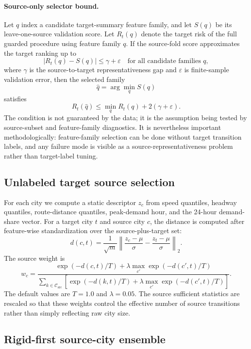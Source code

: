 \paragraph{Source-only selector bound.}
Let $q$ index a candidate target-summary feature family, and let $S(q)$ be its leave-one-source validation score.
Let $R_t(q)$ denote the target risk of the full guarded procedure using feature family $q$.
If the source-fold score approximates the target ranking up to
\[
    |R_t(q)-S(q)|\le \gamma + \varepsilon
    \quad\text{for all candidate families }q,
\]
where $\gamma$ is the source-to-target representativeness gap and $\varepsilon$ is finite-sample validation error, then the selected family
\[
    \hat q=\arg\min_q S(q)
\]
satisfies
\[
    R_t(\hat q)
    \le
    \min_q R_t(q)+2(\gamma+\varepsilon).
\]
The condition is not guaranteed by the data; it is the assumption being tested by source-subset and feature-family diagnostics.
It is nevertheless important methodologically: feature-family selection can be done without target transition labels, and any failure mode is visible as a source-representativeness problem rather than target-label tuning.

\subsection{Unlabeled target source selection}

For each city we compute a static descriptor $z_c$ from speed quantiles, headway quantiles, route-distance quantiles, peak-demand hour, and the 24-hour demand-share vector.
For a target city $t$ and source city $c$, the distance is computed after feature-wise standardization over the source-plus-target set:
\[
    d(c,t) =
    \frac{1}{\sqrt{m}}\left\|
    \frac{z_c-\mu}{\sigma} -
    \frac{z_t-\mu}{\sigma}
    \right\|_2.
\]
The source weight is
\[
    w_c =
    \frac{\exp(-d(c,t)/T) + \lambda \max_{c'} \exp(-d(c',t)/T)}
         {\sum_{k \in \mathcal{C}_{\mathrm{src}}}
          \left[\exp(-d(k,t)/T) + \lambda \max_{c'} \exp(-d(c',t)/T)\right]}.
\]
The default values are $T=1.0$ and $\lambda=0.05$.
The source sufficient statistics are rescaled so that these weights control the effective number of source transitions rather than simply reflecting raw city size.

\subsection{Rigid-first source-city ensemble}

